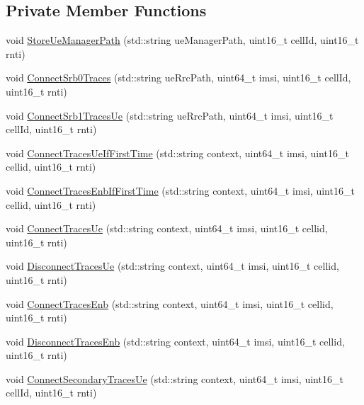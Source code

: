 \subsection*{Private Member Functions}
\begin{DoxyCompactItemize}
\item 
void \hyperlink{classns3_1_1MmWaveBearerStatsConnector_a88fa3dc1acb77f295516326d2805cc3e}{Store\+Ue\+Manager\+Path} (std\+::string ue\+Manager\+Path, uint16\+\_\+t cell\+Id, uint16\+\_\+t rnti)
\item 
void \hyperlink{classns3_1_1MmWaveBearerStatsConnector_a67ba4f3742257431e011553f70426f29}{Connect\+Srb0\+Traces} (std\+::string ue\+Rrc\+Path, uint64\+\_\+t imsi, uint16\+\_\+t cell\+Id, uint16\+\_\+t rnti)
\item 
void \hyperlink{classns3_1_1MmWaveBearerStatsConnector_a00a3d127c4edfb1c16059c62b99f3747}{Connect\+Srb1\+Traces\+Ue} (std\+::string ue\+Rrc\+Path, uint64\+\_\+t imsi, uint16\+\_\+t cell\+Id, uint16\+\_\+t rnti)
\item 
void \hyperlink{classns3_1_1MmWaveBearerStatsConnector_a6fa940ec5e2de1d0ccd464d3ebfd8e16}{Connect\+Traces\+Ue\+If\+First\+Time} (std\+::string context, uint64\+\_\+t imsi, uint16\+\_\+t cellid, uint16\+\_\+t rnti)
\item 
void \hyperlink{classns3_1_1MmWaveBearerStatsConnector_af551613866404eae7febda9d6c3aa773}{Connect\+Traces\+Enb\+If\+First\+Time} (std\+::string context, uint64\+\_\+t imsi, uint16\+\_\+t cellid, uint16\+\_\+t rnti)
\item 
void \hyperlink{classns3_1_1MmWaveBearerStatsConnector_a882bb5b8aaf506a22a03642ec16c30a7}{Connect\+Traces\+Ue} (std\+::string context, uint64\+\_\+t imsi, uint16\+\_\+t cellid, uint16\+\_\+t rnti)
\item 
void \hyperlink{classns3_1_1MmWaveBearerStatsConnector_a39d3fb2475f3c9cc08f17b5edf8ca0b0}{Disconnect\+Traces\+Ue} (std\+::string context, uint64\+\_\+t imsi, uint16\+\_\+t cellid, uint16\+\_\+t rnti)
\item 
void \hyperlink{classns3_1_1MmWaveBearerStatsConnector_ab85a0b5fc1a8d1c1fbb8eedbf1876662}{Connect\+Traces\+Enb} (std\+::string context, uint64\+\_\+t imsi, uint16\+\_\+t cellid, uint16\+\_\+t rnti)
\item 
void \hyperlink{classns3_1_1MmWaveBearerStatsConnector_aa4263e85ba15fe77c8ce666fd0c7951e}{Disconnect\+Traces\+Enb} (std\+::string context, uint64\+\_\+t imsi, uint16\+\_\+t cellid, uint16\+\_\+t rnti)
\item 
void \hyperlink{classns3_1_1MmWaveBearerStatsConnector_a16d8ff8624cc7882bd22dbdab40e061f}{Connect\+Secondary\+Traces\+Ue} (std\+::string context, uint64\+\_\+t imsi, uint16\+\_\+t cell\+Id, uint16\+\_\+t rnti)

\end{DoxyCompactItemize}
